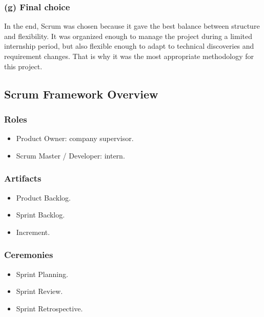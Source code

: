 \subsubsection{(g) Final choice}
In the end, Scrum was chosen because it gave the best balance between structure and flexibility. It was organized enough to manage the project during a limited internship period, but also flexible enough to adapt to technical discoveries and requirement changes. That is why it was the most appropriate methodology for this project.

\subsection{Scrum Framework Overview}
\subsubsection{Roles}
\begin{itemize}[noitemsep]
	\item Product Owner: company supervisor.
	\item Scrum Master / Developer: intern.
\end{itemize}

\subsubsection{Artifacts}
\begin{itemize}[noitemsep]
	\item Product Backlog.
	\item Sprint Backlog.
	\item Increment.
\end{itemize}

\subsubsection{Ceremonies}
\begin{itemize}[noitemsep]
	\item Sprint Planning.
	\item Sprint Review.
	\item Sprint Retrospective.
\end{itemize}

